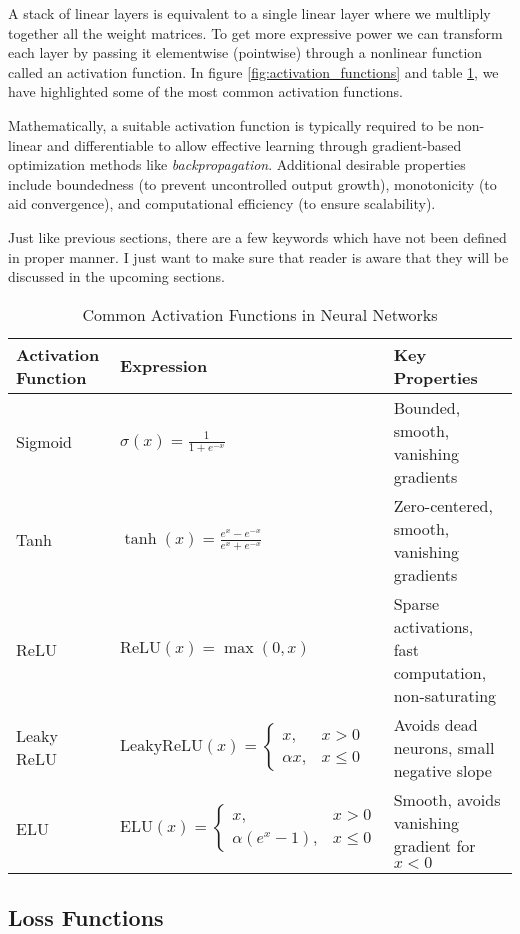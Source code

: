 A stack of linear layers is equivalent to a single linear layer where we multliply together all the weight matrices. To get more expressive power we can transform each layer by passing it elementwise (pointwise) through a nonlinear function called an activation function. In figure \ref{fig:activation_functions} and table \ref{tab:activation_functions}, we have highlighted some of the most common activation functions.

Mathematically, a suitable activation function is typically required to be non-linear and differentiable to allow effective learning through gradient-based optimization methods like \textit{backpropagation}. Additional desirable properties include boundedness (to prevent uncontrolled output growth), monotonicity (to aid convergence), and computational efficiency (to ensure scalability).

Just like previous sections, there are a few keywords which have not been defined in proper manner. I just want to make sure that reader is aware that they will be discussed in the upcoming sections.

\begin{table}[t]
    \centering
    \caption{Common Activation Functions in Neural Networks}
    \renewcommand{\arraystretch}{1.5} %
    \begin{tabular}{|>{\centering\arraybackslash}m{3.5cm}|>{\centering\arraybackslash}m{5.5cm}|>{\centering\arraybackslash}m{5.5cm}|}
    \hline
    \textbf{Activation Function} & \textbf{Expression} & \textbf{Key Properties} \\
    \hline
    Sigmoid & 
    $\displaystyle \sigma(x) = \frac{1}{1 + e^{-x}}$ & 
    Bounded, smooth, vanishing gradients \\
    \hline
    Tanh & 
    $\displaystyle \tanh(x) = \frac{e^x - e^{-x}}{e^x + e^{-x}}$ & 
    Zero-centered, smooth, vanishing gradients \\
    \hline
    ReLU & 
    $\displaystyle \text{ReLU}(x) = \max(0, x)$ & 
    Sparse activations, fast computation, non-saturating \\
    \hline
    Leaky ReLU & 
    $\displaystyle \text{LeakyReLU}(x) = \begin{cases}
    x, & x > 0 \\
    \alpha x, & x \leq 0
    \end{cases}$ & 
    Avoids dead neurons, small negative slope \\
    \hline
    ELU & 
    $\displaystyle \text{ELU}(x) = \begin{cases}
    x, & x > 0 \\
    \alpha(e^x - 1), & x \leq 0
    \end{cases}$ & 
    Smooth, avoids vanishing gradient for $x < 0$ \\
    \hline
    \end{tabular}
    \label{tab:activation_functions}
\end{table}

\subsection{Loss Functions}


    














